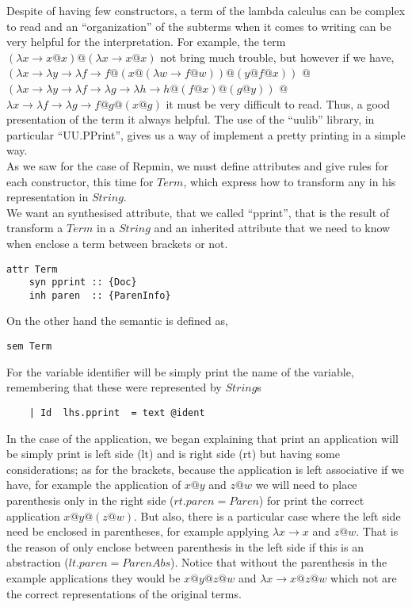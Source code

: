 \documentclass[a4paper,10pt]{article}
\begin{document}
Despite of having few constructors, a term of the lambda calculus can be complex
to read and an ``organization'' of the subterms when it comes to writing can be
very helpful for the interpretation. For example, the term 
$(\lambda x \rightarrow x@x)@(\lambda x \rightarrow x@x)$
not bring much trouble, but however if we have,
$(\lambda x \rightarrow
	\lambda y \rightarrow
		\lambda f \rightarrow f @ (x @ (\lambda w \rightarrow f @ w)) @ (y @ f @ x))$
$@$
$(\lambda x \rightarrow 
	\lambda y \rightarrow \lambda f \rightarrow 
	\lambda g \rightarrow \lambda h \rightarrow h @ (f @ x) @ (g @ y))$
$@$ $\lambda x \rightarrow \lambda f \rightarrow 
		\lambda g \rightarrow f @ g @ (x @ g)$
it must be very difficult to read. Thus, a good presentation of the term it always
helpful. The use of the ``uulib'' library, in particular ``UU.PPrint'', gives us
a way of implement a pretty printing in a simple way.\\

As we saw for the case of Repmin, we must define attributes and give rules for
each constructor, this time for $Term$, which express how to transform any
in his representation in $String$.\\

We want an synthesised attribute, that we called ``pprint'', that is the result
of transform a $Term$ in a $String$ and an inherited attribute that we need to
know when enclose a term between brackets or not.

\begin{lstlisting}
attr Term 
    syn pprint :: {Doc}
    inh paren  :: {ParenInfo}
\end{lstlisting}

\noindent On the other hand the semantic is defined as,

\begin{lstlisting}    
sem Term
\end{lstlisting}
For the variable identifier will be simply print the name of the variable, remembering
that these were represented by $String$s
\begin{lstlisting}    
    | Id  lhs.pprint  = text @ident
\end{lstlisting}

In the case of the application, we began explaining that print an application will
be simply print is left side (lt) and is right side (rt) but having some considerations;
as for the brackets, because the application is left associative if we have, for example
the application of $x@y$ and $z@w$ we will need to place parenthesis only in the right side
($rt.paren = Paren$) for print the correct application $x@y@(z@w)$. But also, there is
a particular case where the left side need be enclosed in parentheses, for example
applying $\lambda x \rightarrow x$ and $z@w$. That is the reason of only enclose between
parenthesis in the left side if this is an abstraction ($lt.paren = ParenAbs$).
Notice that without the parenthesis in the example applications they would be $x@y@z@w$ and
$\lambda x \rightarrow x@z@w$ which not are the correct representations of the original
terms.\\
\end{document}
